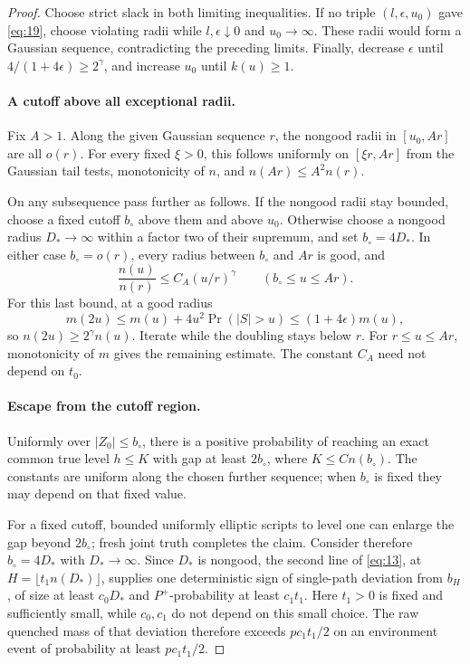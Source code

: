\begin{proof}
Choose strict slack in both limiting inequalities. If no triple
\((l,\epsilon,u_0)\) gave \eqref{eq:19}, choose violating radii while
\(l,\epsilon\downarrow0\) and \(u_0\to\infty\). These radii would
form a Gaussian sequence, contradicting the preceding limits. Finally,
decrease \(\epsilon\) until \(4/(1+4\epsilon)\ge2^\gamma\), and
increase \(u_0\) until \(k(u)\ge1\).

\paragraph{A cutoff above all exceptional radii.}
Fix \(A>1\). Along the given Gaussian sequence \(r\), the nongood
radii in \([u_0,Ar]\) are all \(o(r)\). For every fixed \(\xi>0\),
this follows uniformly on \([\xi r,Ar]\) from the Gaussian tail tests,
monotonicity of \(n\), and \(n(Ar)\le A^2n(r)\).

On any subsequence pass further as follows. If the nongood radii stay
bounded, choose a fixed cutoff \(b_\circ\) above them and above
\(u_0\). Otherwise choose a nongood radius \(D_*\to\infty\) within
a factor two of their supremum, and set \(b_\circ=4D_*\). In either
case \(b_\circ=o(r)\), every radius between \(b_\circ\) and \(Ar\)
is good, and
\[
\frac{n(u)}{n(r)}\le C_A(u/r)^\gamma
\qquad(b_\circ\le u\le Ar).
\tag{20}\label{eq:20}
\]
For this last bound, at a good radius
\[
m(2u)\le m(u)+4u^2\Pr(|S|>u)
\le(1+4\epsilon)m(u),
\]
so \(n(2u)\ge2^\gamma n(u)\). Iterate while the doubling stays
below \(r\). For \(r\le u\le Ar\), monotonicity of \(m\) gives
the remaining estimate. The constant \(C_A\) need not depend on
\(t_0\).

\paragraph{Escape from the cutoff region.}
Uniformly over \(|Z_0|\le b_\circ\), there is a positive probability
of reaching an exact common true level \(h\le K\) with gap at least
\(2b_\circ\), where \(K\le Cn(b_\circ)\). The constants are uniform
along the chosen further sequence; when \(b_\circ\) is fixed they
may depend on that fixed value.

For a fixed cutoff, bounded uniformly elliptic scripts to level one
can enlarge the gap beyond \(2b_\circ\); fresh joint truth completes
the claim. Consider therefore \(b_\circ=4D_*\) with \(D_*\to\infty\).
Since \(D_*\) is nongood, the second line of \eqref{eq:13}, at
\(H=\lfloor t_1n(D_*)\rfloor\), supplies one deterministic sign of
single-path deviation from \(b_H\), of size at least \(c_0D_*\) and
\(P^+\)-probability at least \(c_1t_1\). Here \(t_1>0\) is fixed
and sufficiently small, while \(c_0,c_1\) do not depend on this small
choice. The raw quenched mass of that deviation therefore exceeds
\(pc_1t_1/2\) on an environment event of probability at least
\(pc_1t_1/2\).


\end{proof}
